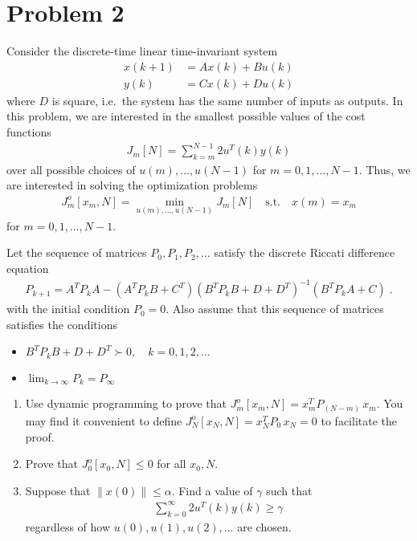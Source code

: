 \section*{Problem 2}

Consider the discrete-time linear time-invariant system
\begin{align*}
    x(k+1) & = Ax(k) + Bu(k) \\
    y(k) & = Cx(k) + Du(k)
\end{align*}
where $D$ is square, i.e.\ the system has the same number of inputs as outputs. In this problem, we are interested in the smallest possible values of the cost functions 
\begin{align*}
    J_m[N] = \sum_{k=m}^{N-1} 2u^T(k) y(k)
\end{align*}
over all possible choices of $u(m),\ldots,u(N-1)$ for $m = 0,1,\ldots,N-1$. Thus, we are interested in solving the optimization problems
\begin{align*}
    J_m^o[x_m,N] = \min_{u(m),\ldots,u(N-1)} J_m[N] \quad \textrm{s.t.} \quad x(m) = x_m
\end{align*}
for $m = 0,1,\ldots,N-1$.

Let the sequence of matrices $P_0, P_1, P_2, \ldots$ satisfy the discrete Riccati difference equation
\begin{align*}
    P_{k+1} = A^T P_k A - (A^T P_k B + C^T) (B^T P_k B + D + D^T)^{-1} (B^T P_k A + C) \; .
\end{align*}
with the initial condition $P_0 = 0$. Also assume that this sequence of matrices satisfies the conditions

\begin{itemize}
    \item
    $B^T P_k B + D + D^T \succ 0, \quad k = 0,1,2,\ldots$

    \item
    $\displaystyle{\lim_{k \rightarrow \infty} P_k = P_\infty}$
%
\end{itemize}

\begin{enumerate}
    \item
    Use dynamic programming to prove that $J_m^o[x_m,N] = x_m^T P_{(N-m)}^{\,} \, x_m$. You may find it convenient to define $J_N^o[x_N,N] = x_N^T P_0^{\,} \, x_N = 0$ to facilitate the proof.
    
    \item
    Prove that $J_0^o[x_0,N] \leq 0$ for all $x_0, N$.

    \item
    Suppose that $\| x(0) \| \leq \alpha$. Find a value of $\gamma$ such that
    \begin{align*}
        \sum_{k=0}^\infty 2 u^T(k) y(k) \geq \gamma
    \end{align*}
    regardless of how $u(0),u(1),u(2),\ldots$ are chosen.
\end{enumerate}

